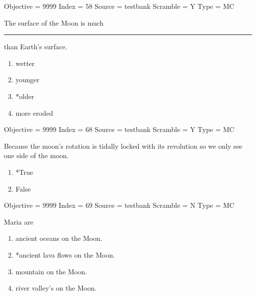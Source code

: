 \documentclass[11pt]{article}
\begin{document}
\begin{enumerate}
\begin{minipage}{\textwidth}
\begin{minipage}{\textwidth}
Objective = 9999
Index = 58
Source = testbank
Scramble = Y
Type = MC
\end{minipage}
\end{minipage}
\vskip 0.20in

\begin{minipage}{\textwidth}
\begin{minipage}{\textwidth}
\item The surface of the Moon is much \rule{10mm}{0.4pt}  than Earth's surface.
\begin{multicols}{3}
\begin{enumerate} 
\setlength{\itemsep}{1pt} 
\setlength{\parskip}{0pt} 
\setlength{\parsep}{0pt}
\setlength{\multicolsep}{1pt} 
\item wetter
\item younger
\item *older
\item more eroded
\end{enumerate} 
\vfill 
\end{multicols}

Objective = 9999
Index = 68
Source = testbank
Scramble = Y
Type = MC
\end{minipage}
\end{minipage}
\vskip 0.20in

\begin{minipage}{\textwidth}
\begin{minipage}{\textwidth}
\item Because the moon's rotation is tidally locked with its revolution so we only see one side of the moon.
\begin{multicols}{3}
\begin{enumerate} 
\setlength{\itemsep}{1pt} 
\setlength{\parskip}{0pt} 
\setlength{\parsep}{0pt}
\setlength{\multicolsep}{1pt} 
\item *True
\item False
\end{enumerate} 
\vfill 
\end{multicols}

Objective = 9999
Index = 69
Source = testbank
Scramble = N
Type = MC
\end{minipage}
\end{minipage}
\vskip 0.20in

\begin{minipage}{\textwidth}
\begin{minipage}{\textwidth}
\item Maria are
\begin{multicols}{2}
\begin{enumerate} 
\setlength{\itemsep}{1pt} 
\setlength{\parskip}{0pt} 
\setlength{\parsep}{0pt}
\setlength{\multicolsep}{1pt} 
\item ancient oceans on the Moon.
\item *ancient lava flows on the Moon.
\item mountain on the Moon.
\item river valley's on the Moon.
\end{enumerate} 
\vfill 
\end{multicols}


\end{minipage}
\end{minipage}
\end{enumerate}
\end{document}
